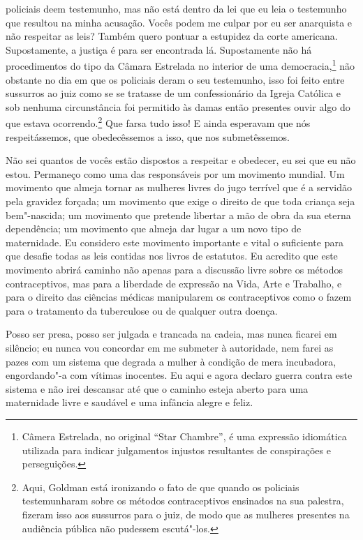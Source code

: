 policiais deem testemunho, mas não está dentro da lei que eu leia o
testemunho que resultou na minha acusação. Vocês podem me culpar por eu
ser anarquista e não respeitar as leis? Também quero pontuar a estupidez
da corte americana. Supostamente, a justiça é para ser encontrada lá.
Supostamente não há procedimentos do tipo da Câmara Estrelada no interior de uma
democracia,\footnote{Câmera Estrelada, no original ``Star Chambre'', é
  uma expressão idiomática utilizada para indicar julgamentos injustos
  resultantes de conspirações e perseguições.} não obstante no dia em que
os policiais deram o seu testemunho, isso foi feito entre sussurros ao
juiz como se se tratasse de um confessionário da Igreja Católica e sob
nenhuma circunstância foi permitido às damas então presentes ouvir algo
do que estava ocorrendo.\footnote{Aqui, Goldman está ironizando o fato
  de que quando os policiais testemunharam sobre os métodos
  contraceptivos ensinados na sua palestra, fizeram isso aos sussurros
  para o juiz, de modo que as mulheres presentes na audiência pública
  não pudessem escutá"-los.} Que farsa tudo isso! E ainda esperavam que
nós respeitássemos, que obedecêssemos a isso, que nos submetêssemos.

Não sei quantos de vocês estão dispostos a respeitar e obedecer, eu sei
que eu não estou. Permaneço como uma das responsáveis por um movimento
mundial. Um movimento que almeja tornar as mulheres livres do jugo
terrível que é a servidão pela gravidez forçada; um movimento que exige
o direito de que toda criança seja bem"-nascida; um movimento que
pretende libertar a mão de obra da sua eterna dependência; um movimento
que almeja dar lugar a um novo tipo de maternidade. Eu considero este
movimento importante e vital o suficiente para que desafie todas as leis
contidas nos livros de estatutos. Eu acredito que este movimento abrirá
caminho não apenas para a discussão livre sobre os métodos
contraceptivos, mas para a liberdade de expressão na Vida, Arte e
Trabalho, e para o direito das ciências médicas manipularem os
contraceptivos como o fazem para o tratamento da tuberculose ou de
qualquer outra doença.

Posso ser presa, posso ser julgada e trancada na cadeia, mas nunca
ficarei em silêncio; eu nunca vou concordar em me submeter à autoridade,
nem farei as pazes com um sistema que degrada a mulher à condição de
mera incubadora, engordando"-a com vítimas inocentes. Eu aqui e agora
declaro guerra contra este sistema e não irei descansar até que o
caminho esteja aberto para uma maternidade livre e saudável e uma
infância alegre e feliz.

